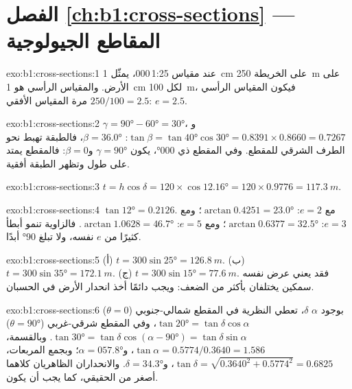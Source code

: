\section*{الفصل \ref{ch:b1:cross-sections} --- المقاطع الجيولوجية}

\begin{solution}{exo:b1:cross-sections:1}
عند مقياس 1:25\,000، يمثّل \qty{1}{cm} على الخريطة \qty{250}{m} على الأرض. والمقياس الرأسي هو \qty{1}{cm} لكل \qty{100}{m}، فيكون المقياس الرأسي $250/100 = 2.5$ مرة المقياس الأفقي: $e = 2.5$.
\end{solution}

\begin{solution}{exo:b1:cross-sections:2}
$\gamma = \ang{90} - \ang{60} = \ang{30}$، و$\tan\beta = \tan\ang{40}
\cos\ang{30} = 0.8391\times0.8660 = 0.7267$: $\beta = \ang{36.0}$، فالطبقة تهبط نحو الطرف الشرقي للمقطع. وفي المقطع ذي 
\ang{000}، يكون $\gamma = \ang{90}$ و$\beta = 0$: فالمقطع يمتد على طول  وتظهر الطبقة أفقية.
\end{solution}

\begin{solution}{exo:b1:cross-sections:3}
$t = h\cos\delta = 120\times\cos\ang{12.16} = 120\times0.9776 =
\qty{117.3}{m}$.
\end{solution}

\begin{solution}{exo:b1:cross-sections:4}
$\tan\ang{12} = 0.2126$. مع $e = 2$: $\arctan 0.4251 = \ang{23.0}$؛ ومع
$e = 3$: $\arctan 0.6377 = \ang{32.5}$؛ ومع $e = 5$: $\arctan 1.0628 =
\ang{46.7}$. فالزاوية تنمو أبطأ كثيرًا من $e$ نفسه، ولا تبلغ \ang{90} أبدًا.
\end{solution}

\begin{solution}{exo:b1:cross-sections:5}
(أ) $t = 300\sin\ang{25} = \qty{126.8}{m}$. (ب) $t = 300\sin\ang{35} =
\qty{172.1}{m}$. (ج) $t = 300\sin\ang{15} = \qty{77.6}{m}$. فقد يعني عرض  نفسه سمكين يختلفان بأكثر من الضعف: ويجب دائمًا أخذ انحدار الأرض في الحسبان.
\end{solution}

\begin{solution}{exo:b1:cross-sections:6}
بوجود  $\alpha$  $\delta$، تعطي النظرية في المقطع شمالي-جنوبي ($\theta = 0$) $\tan\ang{20} = \tan\delta\cos\alpha$،
وفي المقطع شرقي-غربي ($\theta = \ang{90}$) $\tan\ang{30} =
\tan\delta\cos(\alpha - \ang{90}) = \tan\delta\sin\alpha$. وبالقسمة،
$\tan\alpha = 0.5774/0.3640 = 1.586$، و$\alpha = \ang{057.8}$؛ وبجمع المربعات،
$\tan\delta = \sqrt{0.3640^2 + 0.5774^2} = 0.6825$، و$\delta =
\ang{34.3}$. والانحداران الظاهريان كلاهما أصغر من  الحقيقي، كما يجب أن يكون.
\end{solution}

